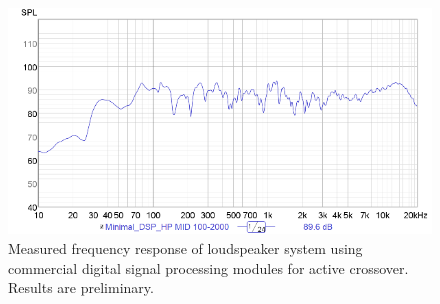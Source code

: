%
\begin{figure}[h!]
\centering
\includegraphics[height = 3.5 in]{Images/sp_spl_combined_prelim.png}
\caption{Measured frequency response of loudspeaker system using commercial digital signal processing modules for active crossover. Results are preliminary.}
\label{fig:sp_early_dsp}
\end{figure}